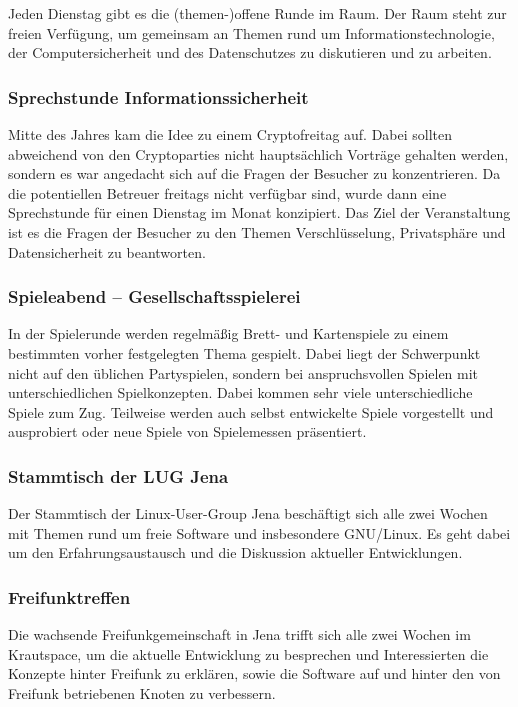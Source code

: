 \documentclass[ngerman]{scrartcl}
\begin{document}
Jeden Dienstag gibt es die (themen-)offene Runde im Raum. Der Raum
steht zur freien Verfügung, um gemeinsam an Themen rund um
Informationstechnologie, der Computersicherheit und des
Datenschutzes zu diskutieren und zu arbeiten.

\subsubsection{Sprechstunde Informationssicherheit}

Mitte des Jahres kam die Idee zu einem Cryptofreitag auf. 
Dabei sollten abweichend von den Cryptoparties nicht hauptsächlich Vorträge gehalten werden, sondern es war angedacht sich auf die Fragen der Besucher zu konzentrieren. 
Da die potentiellen Betreuer freitags nicht verfügbar sind, wurde dann eine Sprechstunde für einen Dienstag im Monat konzipiert. 
Das Ziel der Veranstaltung ist es die Fragen der Besucher zu den Themen Verschlüsselung, Privatsphäre und Datensicherheit zu beantworten. 

\subsubsection{Spieleabend -- Gesellschaftsspielerei}

In der Spielerunde werden regelmäßig Brett- und Kartenspiele zu einem
bestimmten vorher festgelegten Thema gespielt. Dabei liegt der Schwerpunkt
nicht auf den üblichen Partyspielen, sondern bei anspruchsvollen Spielen mit
unterschiedlichen Spielkonzepten. Dabei kommen sehr viele unterschiedliche
Spiele zum Zug. Teilweise werden auch selbst entwickelte Spiele vorgestellt
und ausprobiert oder neue Spiele von Spielemessen präsentiert.

\subsubsection{Stammtisch der LUG Jena}

Der Stammtisch der Linux-User-Group Jena beschäftigt sich alle zwei Wochen
mit Themen rund um freie Software und insbesondere GNU/Linux. Es geht dabei
um den Erfahrungsaustausch und die Diskussion aktueller Entwicklungen.

\subsubsection{Freifunktreffen}

Die wachsende Freifunkgemeinschaft in Jena trifft sich alle zwei Wochen
im Krautspace, um die aktuelle Entwicklung zu besprechen und
Interessierten die Konzepte hinter Freifunk zu erklären, sowie die
Software auf und hinter den von Freifunk betriebenen Knoten zu
verbessern.
\end{document}
